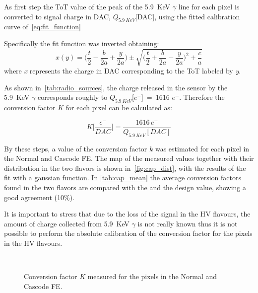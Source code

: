 As first step the ToT value of the peak of the \SI{5.9}{KeV} $\gamma$ line for each pixel is converted to signal charge in DAC, $Q_{\SI{5.9}{KeV}}$[DAC], using the fitted calibration curve of~\autoref{eq:fit_function}

Specifically the fit function was inverted obtaining:
\begin{equation}
x(y) = \bigg(\frac{t}{2} - \frac{b}{2a} + \frac{y}{2a}\bigg) \pm \sqrt{\bigg(\frac{t}{2} + \frac{b}{2a} - \frac{y}{2a}\bigg)^{2} + \frac{c}{a}}
\end{equation}
where \textit{x} represents the charge in DAC corresponding to the ToT labeled by \textit{y}.

As shown in~\autoref{tab:radio_sources}, the charge released in the sensor by the \SI{5.9}{KeV} $\gamma$ corresponds roughly to $Q_{\SI{5.9}{KeV}}$[$e^{-}$]~=~1616 $e^{-}$. Therefore the conversion factor $K$ for each pixel can be calculated as:

\begin{equation}
K\bigg[\frac{e^{-}}{DAC}\bigg] = \frac{1616 \, e^{-}}{Q_{\SI{5.9}{KeV}}[DAC]}
\label{eq:inj_cap}
\end{equation} 

By these steps, a value of the conversion factor $k$ was estimated for each pixel in the Normal and Cascode FE. The map of the measured values together with their distribution in the two flavors is shown in~\autoref{fig:cap_dist}, with the results of the fit with a gaussian function. In \autoref{tab:cap_mean} the average conversion factors found in the two flavors are compared with the and the design value, showing a good agreement (10\%).

It is important to stress that due to the loss of the signal in the HV flavours, the amount of charge collected from \SI{5.9}{KeV} $\gamma$ is not really known thus it is not possible to perform the absolute calibration of the conversion factor for the pixels in the HV flavours. 

\begin{figure}[h!]
\centering
{}\quad
{}\quad
{}\\
\caption{Conversion factor $K$ measured for the pixels in the Normal and Cascode FE.}
\label{fig:cap_dist}
\end{figure} 
%


